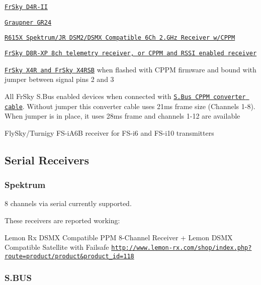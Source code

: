 \begin{DoxyItemize}
\item \href{http://www.frsky-rc.com/product/pro.php?pro_id=24}{\tt Fr\+Sky D4\+R-\/\+I\+I}
\item \href{http://www.graupner.de/en/products/33512/product.aspx}{\tt Graupner G\+R24}
\item \href{http://orangerx.com/2014/05/20/r615x-spektrumjr-dsm2dsmx-compatible-6ch-2-4ghz-receiver-wcppm-2/}{\tt R615\+X Spektrum/\+J\+R D\+S\+M2/\+D\+S\+M\+X Compatible 6\+Ch 2.\+G\+Hz Receiver w/\+C\+P\+P\+M}
\item \href{http://www.frsky-rc.com/product/pro.php?pro_id=21}{\tt Fr\+Sky D8\+R-\/\+X\+P 8ch telemetry receiver, or C\+P\+P\+M and R\+S\+S\+I enabled receiver}
\item \href{http://www.frsky-rc.com/download/view.php?sort=&down=158&file=X4R-X4RSB}{\tt Fr\+Sky X4\+R and Fr\+Sky X4\+R\+S\+B} when flashed with C\+P\+P\+M firmware and bound with jumper between signal pins 2 and 3
\item All Fr\+Sky S.\+Bus enabled devices when connected with \href{http://www.frsky-rc.com/product/pro.php?pro_id=112}{\tt S.\+Bus C\+P\+P\+M converter cable}. Without jumper this converter cable uses 21ms frame size (Channels 1-\/8). When jumper is in place, it uses 28ms frame and channels 1-\/12 are available
\item Fly\+Sky/\+Turnigy F\+S-\/i\+A6\+B receiver for F\+S-\/i6 and F\+S-\/i10 transmitters
\end{DoxyItemize}

\subsection*{Serial Receivers}

\subsubsection*{Spektrum}

8 channels via serial currently supported.

These receivers are reported working\+:

Lemon Rx D\+S\+M\+X Compatible P\+P\+M 8-\/\+Channel Receiver + Lemon D\+S\+M\+X Compatible Satellite with Failsafe \href{http://www.lemon-rx.com/shop/index.php?route=product/product&product_id=118}{\tt http\+://www.\+lemon-\/rx.\+com/shop/index.\+php?route=product/product\&product\+\_\+id=118}

\subsubsection*{S.\+B\+U\+S}

